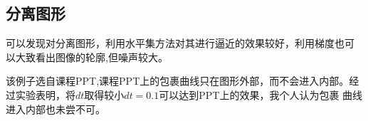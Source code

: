 \documentclass[a4paper,  11pt]{ctexart}
\begin{document}
\subsection{分离图形}
\begin{figure}[H]
    \centering
\end{figure}
可以发现对分离图形，利用水平集方法对其进行逼近的效果较好，利用梯度也可
以大致看出图像的轮廓,但噪声较大。 \par
该例子选自课程PPT,课程PPT上的包裹曲线只在图形外部，而不会进入内部。经
过实验表明，将$dt$取得较小$dt=0.1$可以达到PPT上的效果，我个人认为包裹
曲线进入内部也未尝不可。
\end{document}
